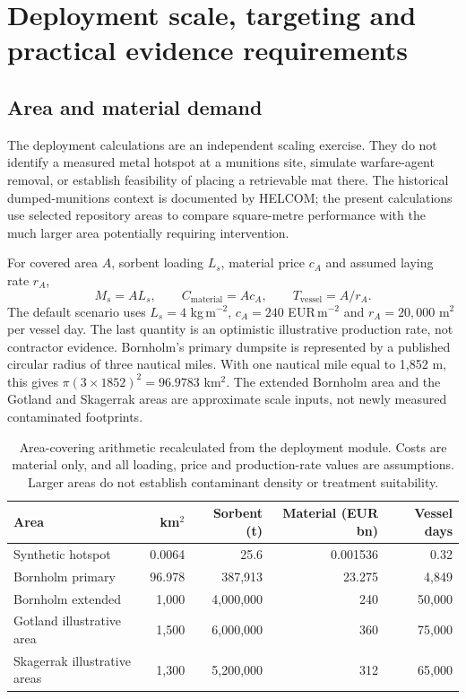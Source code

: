 \section{Deployment scale, targeting and practical evidence requirements}
\label{sec:deployment}

\subsection{Area and material demand}

The deployment calculations are an independent scaling exercise. They do not identify a measured metal hotspot at a munitions site, simulate warfare-agent removal, or establish feasibility of placing a retrievable mat there. The historical dumped-munitions context is documented by HELCOM; the present calculations use selected repository areas to compare square-metre performance with the much larger area potentially requiring intervention.\cite{helcom2025}

For covered area $A$, sorbent loading $L_s$, material price $c_A$ and assumed laying rate $r_A$,
\begin{equation}
M_s=AL_s,\qquad C_{\mathrm{material}}=Ac_A,\qquad
T_{\mathrm{vessel}}=A/r_A.
\end{equation}
The default scenario uses $L_s=4$ kg\,m$^{-2}$, $c_A=240$ EUR\,m$^{-2}$ and $r_A=20{,}000$ m$^2$ per vessel day. The last quantity is an optimistic illustrative production rate, not contractor evidence. Bornholm's primary dumpsite is represented by a published circular radius of three nautical miles.\cite{bornholm2010} With one nautical mile equal to 1,852 m, this gives $\pi(3\times1852)^2=96.9783$ km$^2$. The extended Bornholm area and the Gotland and Skagerrak areas are approximate scale inputs, not newly measured contaminated footprints.

\begin{table}[htbp]
\centering\small
\caption{Area-covering arithmetic recalculated from the deployment module. Costs are material only, and all loading, price and production-rate values are assumptions. Larger areas do not establish contaminant density or treatment suitability.}
\label{tab:deployment-scale}
\begin{tabular}{lrrrr}
\toprule
Area & km$^2$ & Sorbent (t) & Material (EUR bn) & Vessel days \\
\midrule
Synthetic hotspot & 0.0064 & 25.6 & 0.001536 & 0.32 \\
Bornholm primary & 96.978 & 387,913 & 23.275 & 4,849 \\
Bornholm extended & 1,000 & 4,000,000 & 240 & 50,000 \\
Gotland illustrative area & 1,500 & 6,000,000 & 360 & 75,000 \\
Skagerrak illustrative areas & 1,300 & 5,200,000 & 312 & 65,000 \\
\bottomrule
\end{tabular}
\end{table}

